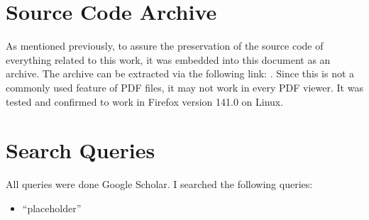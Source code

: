 \documentclass[a4paper]{article}
\begin{document}


\listoftodos
\newpage

\tableofcontents
\newpage















\printbibliography

\appendix

\section{Source Code Archive}
As mentioned previously, to assure the preservation of the source code of everything related to this work, it was embedded into this document as an archive.
The archive can be extracted via the following link: .
Since this is not a commonly used feature of PDF files, it may not work in every PDF viewer.
It was tested and confirmed to work in Firefox version 141.0 on Linux.

\section{Search Queries}
\label{app:repro-search-queries}
All queries were done Google Scholar. I searched the following queries:
\begin{itemize}
    \item ``placeholder''
\end{itemize}

\end{document}
